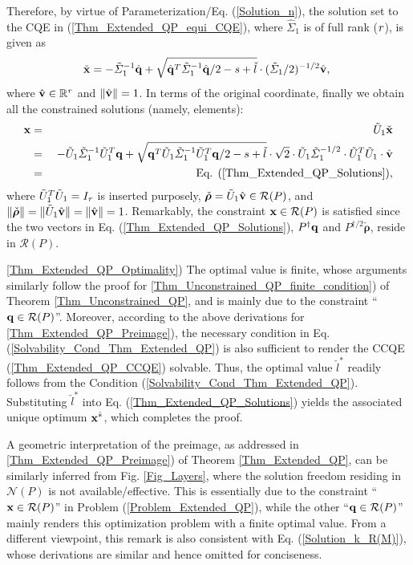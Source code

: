 \documentclass{imaman}
\newcommand{\beq}{\begin{eqnarray}}
\newcommand{\eeq}{\end{eqnarray}}
\newcommand{\bfx}{{\bf x}}
\newcommand{\bfq}{{\bf q}}
\newcommand{\bfv}{{\bf v}}
\newcommand{\bfrho}{{\boldsymbol \rho}}
\newcommand{\real}{\mathbb{R}}
\newcommand{\calN}{{\mathcal N}}
\newcommand{\calR}{{\mathcal R}}
\newcommand{\itr}{{\it r}}
\numberwithin{equation}{section}
\begin{document}
Therefore, by virtue of Parameterization/Eq. (\ref{Solution_n}), the solution set to the CQE in (\ref{Thm_Extended_QP_equi_CQE}), where $\hat\Sigma_1$ is of full rank ($\itr$), is given as
\beq
\check\bfx=-\tilde\Sigma_1^{-1}\hat\bfq+\sqrt{{\hat\bfq^T\tilde\Sigma_1^{-1}\hat\bfq/2}-s+\check l}\cdot ({\tilde\Sigma_1/2})^{-{1/2}}\hat\bfv,~
\eeq
where $\hat\bfv\in\real^\itr$ and $\Vert\hat\bfv\Vert=1$. In terms of the original coordinate, finally we obtain all the constrained solutions (namely, elements):
\beq
\bfx&{}={}&\tilde U_1\check\bfx\nonumber\\
&{}={}&-\tilde U_1\tilde\Sigma_1^{-1}\tilde U_1^T\bfq+\sqrt{\bfq^T\tilde U_1\tilde\Sigma_1^{-1}\tilde U_1^T\bfq/2-s+\check l}\cdot\sqrt{2}\cdot\tilde U_1\tilde\Sigma_1^{-1/2}\cdot\tilde U_1^T\tilde U_1\cdot \hat\bfv\nonumber\\
&{}={}&\mbox{Eq. (\ref{Thm_Extended_QP_Solutions})},\nonumber
\eeq
where $\tilde U_1^T\tilde U_1=I_\itr$ is inserted purposely, $\check\bfrho=\tilde U_1\hat\bfv\in \calR(P)$, and $\Vert\check\bfrho\Vert=\Vert\tilde U_1\hat\bfv\Vert=\Vert\hat\bfv\Vert=1$. Remarkably, the constraint $\bfx\in \calR(P)$ is satisfied since the two vectors in Eq. (\ref{Thm_Extended_QP_Solutions}), $P^\dagger\bfq$ and $P^{\dagger/2}\check\bfrho$, reside in $\calR(P)$.\vspace{0.16cm}

\noindent\ref{Thm_Extended_QP_Optimality}) The optimal value is finite, whose arguments similarly follow the proof for \ref{Thm_Unconstrained_QP_finite_condition}) of Theorem \ref{Thm_Unconstrained_QP}, and is mainly due to the constraint ``$\bfq\in\calR(P)$''. Moreover, according to the above derivations for \ref{Thm_Extended_QP_Preimage}), the necessary condition in Eq. (\ref{Solvability_Cond_Thm_Extended_QP}) is also sufficient to render the CCQE (\ref{Thm_Extended_QP_CCQE}) solvable. Thus, the optimal value $\check l^*$ readily follows from the Condition (\ref{Solvability_Cond_Thm_Extended_QP}). Substituting $\check l^*$ into Eq. (\ref{Thm_Extended_QP_Solutions}) yields the associated unique optimum $\bfx^{\hat *}$, which completes the proof.

\begin{remark}
A geometric interpretation of the preimage, as addressed in \ref{Thm_Extended_QP_Preimage}) of Theorem \ref{Thm_Extended_QP}, can be similarly inferred from Fig. \ref{Fig_Layers}, where the solution freedom residing in $\calN(P)$ is not available/effective. This is essentially due to the constraint ``$\bfx\in\calR(P)$'' in Problem (\ref{Problem_Extended_QP}), while the other ``$\bfq\in\calR(P)$'' mainly renders this optimization problem with a finite optimal value. From a different viewpoint, this remark is also consistent with Eq. (\ref{Solution_k_R(M)}), whose derivations are similar and hence omitted for conciseness.
\end{remark}
\end{document}
